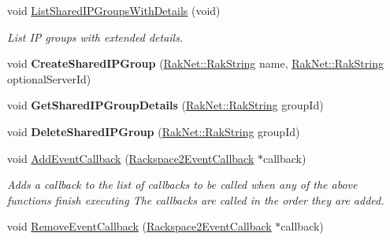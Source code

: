 \begin{DoxyCompactItemize}
void \hyperlink{class_rak_net_1_1_rackspace_a451db961d0eff895223a2287d80c1007}{List\-Shared\-I\-P\-Groups\-With\-Details} (void)
\begin{DoxyCompactList}\small\item\em List I\-P groups with extended details. \end{DoxyCompactList}\item 
\hypertarget{class_rak_net_1_1_rackspace_a6bd02aaadff3a889cc626f64c6ac0b0f}{void {\bfseries Create\-Shared\-I\-P\-Group} (\hyperlink{class_rak_net_1_1_rak_string}{Rak\-Net\-::\-Rak\-String} name, \hyperlink{class_rak_net_1_1_rak_string}{Rak\-Net\-::\-Rak\-String} optional\-Server\-Id)}\label{class_rak_net_1_1_rackspace_a6bd02aaadff3a889cc626f64c6ac0b0f}

\item 
\hypertarget{class_rak_net_1_1_rackspace_a302fe939d47a3af6582db940c7b15910}{void {\bfseries Get\-Shared\-I\-P\-Group\-Details} (\hyperlink{class_rak_net_1_1_rak_string}{Rak\-Net\-::\-Rak\-String} group\-Id)}\label{class_rak_net_1_1_rackspace_a302fe939d47a3af6582db940c7b15910}

\item 
\hypertarget{class_rak_net_1_1_rackspace_a19fc074472fbf10b7af8aaa9875023f4}{void {\bfseries Delete\-Shared\-I\-P\-Group} (\hyperlink{class_rak_net_1_1_rak_string}{Rak\-Net\-::\-Rak\-String} group\-Id)}\label{class_rak_net_1_1_rackspace_a19fc074472fbf10b7af8aaa9875023f4}

\item 
\hypertarget{class_rak_net_1_1_rackspace_a9f00f9d6b2a04ac9247de25962ea8ad8}{void \hyperlink{class_rak_net_1_1_rackspace_a9f00f9d6b2a04ac9247de25962ea8ad8}{Add\-Event\-Callback} (\hyperlink{class_rak_net_1_1_rackspace2_event_callback}{Rackspace2\-Event\-Callback} $\ast$callback)}\label{class_rak_net_1_1_rackspace_a9f00f9d6b2a04ac9247de25962ea8ad8}

\begin{DoxyCompactList}\small\item\em Adds a callback to the list of callbacks to be called when any of the above functions finish executing The callbacks are called in the order they are added. \end{DoxyCompactList}\item 
\hypertarget{class_rak_net_1_1_rackspace_a5d6ac702f5de2351340319f252610dd5}{void \hyperlink{class_rak_net_1_1_rackspace_a5d6ac702f5de2351340319f252610dd5}{Remove\-Event\-Callback} (\hyperlink{class_rak_net_1_1_rackspace2_event_callback}{Rackspace2\-Event\-Callback} $\ast$callback)}\label{class_rak_net_1_1_rackspace_a5d6ac702f5de2351340319f252610dd5}


\end{DoxyCompactItemize}
